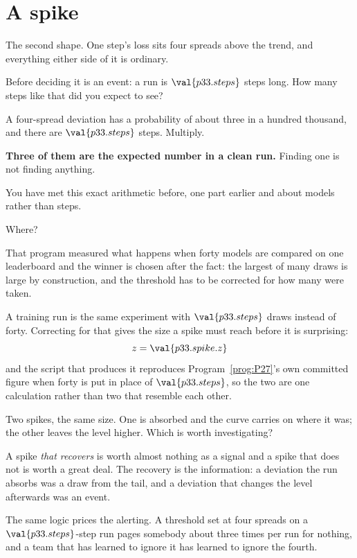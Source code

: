 \section{A spike}
\label{sec:P33-spike}

\begin{fr}
The second shape. One step's loss sits four spreads above the trend, and
everything either side of it is ordinary.

Before deciding it is an event: a run is $\val{p33.steps}$ steps long. How
many steps like that did you expect to see?
\dotline
\nextframe
\end{fr}

\begin{fr}
A four-spread deviation has a probability of about three in a hundred
thousand, and there are $\val{p33.steps}$ steps. Multiply.

\textbf{Three of them are the expected number in a clean run.} Finding one is
not finding anything.
\end{fr}

\begin{fr}
You have met this exact arithmetic before, one part earlier and about models
rather than steps.

Where?
\dotline
\nextframe
\end{fr}

\begin{fr}
That program measured what happens when forty models are compared on one
leaderboard and the winner is chosen after the fact: the largest of many
draws is large by construction, and the threshold has to be corrected for how
many were taken.

A training run is the same experiment with $\val{p33.steps}$ draws instead of
forty. Correcting for that gives the size a spike must reach before it is
surprising:
\[ z = \val{p33.spike.z} \]
and the script that produces it reproduces Program~\ref{prog:P27}'s own
committed figure when forty is put in place of $\val{p33.steps}$, so the two
are one calculation rather than two that resemble each other.

Two spikes, the same size. One is absorbed and the curve carries on where it
was; the other leaves the level higher. Which is worth investigating?
\dotline
\nextframe
\end{fr}

\begin{fr}
\begin{aibox}
A spike \emph{that recovers} is worth almost nothing as a signal and a spike
that does not is worth a great deal. The recovery is the information: a deviation the run absorbs was a draw from the tail, and a
deviation that changes the level afterwards was an event.

The same logic prices the alerting. A threshold set at four spreads on a
$\val{p33.steps}$-step run pages somebody about three times per run for
nothing, and a team that has learned to ignore it has learned to ignore the
fourth.
\end{aibox}
\end{fr}

